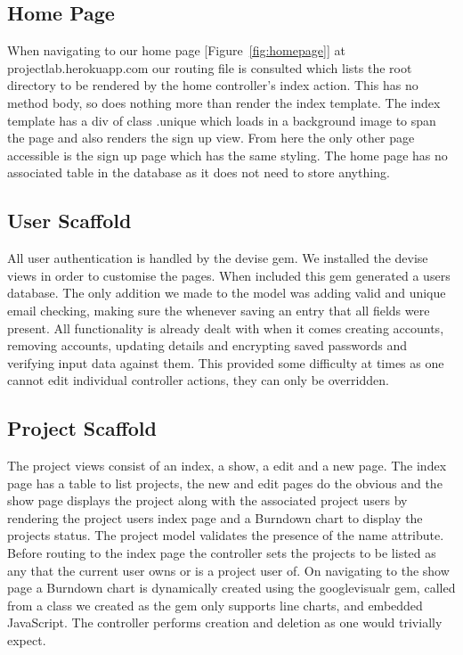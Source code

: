 \documentclass[a4wide, 11pt]{article}
\begin{document}
\subsection{Home Page}
When navigating to our home page [Figure~\ref{fig:homepage}] at projectlab.herokuapp.com our routing file is consulted which lists the root directory to be rendered by the home controller’s index action. This has no method body, so does nothing more than render the index template. The index template has a div of class .unique which loads in a background image to span the page and also renders the sign up view. From here the only other page accessible is the sign up page which has the same styling. The home page has no associated table in the database as it does not need to store anything.

\subsection{User Scaffold}
All user authentication is handled by the devise gem. We installed the devise views in order to customise the pages. When included this gem generated a users database. The only addition we made to the model was adding valid and unique email checking, making sure the whenever saving an entry that all fields were present. All functionality is already dealt with when it comes creating accounts, removing accounts, updating details and encrypting saved passwords and verifying input data against them. This provided some difficulty at times as one cannot edit individual controller actions, they can only be overridden.

\subsection{Project Scaffold}
The project views consist of an index, a show, a edit and a new page. The index page has a table to list projects, the new and edit pages do the obvious and the show page displays the project along with the associated project users by rendering the project users index page and a Burndown chart to display the projects status. The project model validates the presence of the name attribute. Before routing to the index page the controller sets the projects to be listed as any that the current user owns or is a project user of. On navigating to the show page a Burndown chart is dynamically created using the googlevisualr gem, called from a class we created as the gem only supports line charts, and embedded JavaScript. The controller performs creation and deletion as one would trivially expect.
\end{document}
